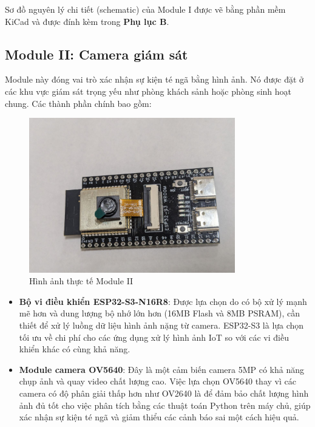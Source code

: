 Sơ đồ nguyên lý chi tiết (schematic) của Module I được vẽ bằng phần mềm KiCad và được đính kèm trong \textbf{Phụ lục B}.

\subsection{Module II: Camera giám sát}
\label{ssec:module_two}

Module này đóng vai trò xác nhận sự kiện té ngã bằng hình ảnh. Nó được đặt ở các khu vực giám sát trọng yếu như phòng khách sảnh hoặc phòng sinh hoạt chung. Các thành phần chính bao gồm:

\begin{figure}[H]
 	\centering
 	\includegraphics[width=0.8\textwidth]{figures/real_board2.jpg}
 	\caption{Hình ảnh thực tế Module II}
 	\label{fig:module2_photo}
\end{figure}

\begin{itemize}
 	\item \textbf{Bộ vi điều khiển ESP32-S3-N16R8}: Được lựa chọn do có bộ xử lý mạnh mẽ hơn và dung lượng bộ nhớ lớn hơn (16MB Flash và 8MB PSRAM), cần thiết để xử lý luồng dữ liệu hình ảnh nặng từ camera. ESP32-S3 là lựa chọn tối ưu về chi phí cho các ứng dụng xử lý hình ảnh IoT so với các vi điều khiển khác có cùng khả năng.
 	\item \textbf{Module camera OV5640}: Đây là một cảm biến camera 5MP có khả năng chụp ảnh và quay video chất lượng cao. Việc lựa chọn OV5640 thay vì các camera có độ phân giải thấp hơn như OV2640 là để đảm bảo chất lượng hình ảnh đủ tốt cho việc phân tích bằng các thuật toán Python trên máy chủ, giúp xác nhận sự kiện té ngã và giảm thiểu các cảnh báo sai một cách hiệu quả.
\end{itemize}

